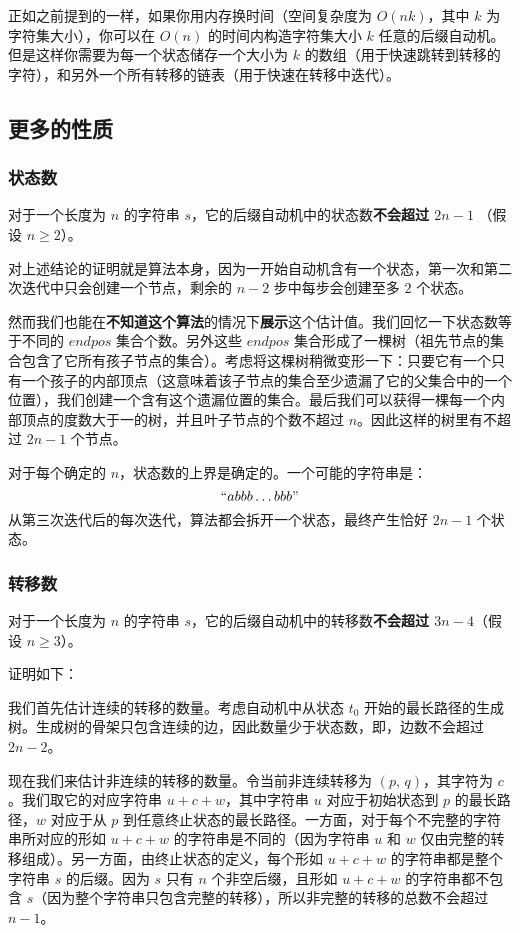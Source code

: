 正如之前提到的一样，如果你用内存换时间（空间复杂度为 \(O(nk)\)，其中
\(k\) 为字符集大小），你可以在 \(O(n)\) 的时间内构造字符集大小 \(k\)
任意的后缀自动机。但是这样你需要为每一个状态储存一个大小为 \(k\)
的数组（用于快速跳转到转移的字符），和另外一个所有转移的链表（用于快速在转移中迭代）。

\subsection{更多的性质}

\subsubsection{状态数}

对于一个长度为 \(n\) 的字符串
\(s\)，它的后缀自动机中的状态数\textbf{不会超过 \(2n-1\)} （假设
\(n\ge2\)）。

对上述结论的证明就是算法本身，因为一开始自动机含有一个状态，第一次和第二次迭代中只会创建一个节点，剩余的
\(n-2\) 步中每步会创建至多 \(2\) 个状态。

然而我们也能在\textbf{不知道这个算法}的情况下\textbf{展示}这个估计值。我们回忆一下状态数等于不同的
\(endpos\) 集合个数。另外这些 \(endpos\)
集合形成了一棵树（祖先节点的集合包含了它所有孩子节点的集合）。考虑将这棵树稍微变形一下：只要它有一个只有一个孩子的内部顶点（这意味着该子节点的集合至少遗漏了它的父集合中的一个位置），我们创建一个含有这个遗漏位置的集合。最后我们可以获得一棵每一个内部顶点的度数大于一的树，并且叶子节点的个数不超过
\(n\)。因此这样的树里有不超过 \(2n-1\) 个节点。

对于每个确定的 \(n\)，状态数的上界是确定的。一个可能的字符串是：
\[
``abbb\ldots bbb"
\]
从第三次迭代后的每次迭代，算法都会拆开一个状态，最终产生恰好 \(2n-1\)
个状态。

\subsubsection{转移数}

对于一个长度为 \(n\) 的字符串
\(s\)，它的后缀自动机中的转移数\textbf{不会超过 \(3n-4\)}（假设
\(n\ge 3\)）。

证明如下：

我们首先估计连续的转移的数量。考虑自动机中从状态 \(t_0\)
开始的最长路径的生成树。生成树的骨架只包含连续的边，因此数量少于状态数，即，边数不会超过
\(2n-2\)。

现在我们来估计非连续的转移的数量。令当前非连续转移为
\((p,\,q)\)，其字符为 \(c\)。我们取它的对应字符串 \(u+c+w\)，其中字符串
\(u\) 对应于初始状态到 \(p\) 的最长路径，\(w\) 对应于从 \(p\)
到任意终止状态的最长路径。一方面，对于每个不完整的字符串所对应的形如
\(u+c+w\) 的字符串是不同的（因为字符串 \(u\) 和 \(w\)
仅由完整的转移组成）。另一方面，由终止状态的定义，每个形如 \(u+c+w\)
的字符串都是整个字符串 \(s\) 的后缀。因为 \(s\) 只有 \(n\)
个非空后缀，且形如 \(u+c+w\) 的字符串都不包含
\(s\)（因为整个字符串只包含完整的转移），所以非完整的转移的总数不会超过
\(n-1\)。

